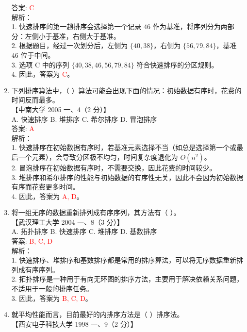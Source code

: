 \documentclass[lang=cn,newtx,10pt,scheme=chinese]{../../../elegantbook}
\begin{document}
\begin{enumerate}
    答案: \textcolor{red}{C} \\

    解析：\\
    1. 快速排序的第一趟排序会选择第一个记录 $46$ 作为基准，将序列分为两部分：左侧小于基准，右侧大于基准。\\
    2. 根据题目，经过一次划分后，左侧为 $\{40, 38\}$，右侧为 $\{56, 79, 84\}$，基准 $46$ 位于中间。\\
    3. 选项 C 中的序列 $\{40, 38, 46, 56, 79, 84\}$ 符合快速排序的分区规则。\\
    4. 因此，答案为 \textcolor{red}{C}。\\
    \item 下列排序算法中，（ ）算法可能会出现下面的情况：初始数据有序时，花费的时间反而最多。\\
    【中南大学 2005 一、4（2 分）】\\  

    A. 快速排序 \quad B. 堆排序 \quad C. 希尔排序 \quad D. 冒泡排序 \\

    答案: \textcolor{red}{A} \\

    解析：\\
    1. 快速排序在初始数据有序时，若基准元素选择不当（如总是选择第一个或最后一个元素），会导致分区极不均匀，时间复杂度退化为 $O(n^2)$。\\
    2. 冒泡排序在初始数据有序时，不需要交换，因此花费的时间较少。\\
    3. 堆排序和希尔排序的性能与初始数据的有序性无关，因此不会因为初始数据有序而花费更多时间。\\
    4. 因此，答案为 \textcolor{red}{A, D}。\\

    \item 将一组无序的数据重新排列成有序序列，其方法有（ ）。\\
    【武汉理工大学 2004 一、8（3 分）】\\  

    A. 拓扑排序 \quad B. 快速排序 \quad C. 堆排序 \quad D. 基数排序 \\

    答案: \textcolor{red}{B, C, D} \\

    解析：\\
    1. 快速排序、堆排序和基数排序都是常用的排序算法，可以将无序数据重新排列成有序序列。\\
    2. 拓扑排序是一种用于有向无环图的排序方法，主要用于解决依赖关系问题，不适用于一般的排序任务。\\
    3. 因此，答案为 \textcolor{red}{B, C, D}。\\
    \item 就平均性能而言，目前最好的内排序方法是（ ）排序法。\\
    【西安电子科技大学 1998 一、9（2 分）】\\  


\end{enumerate}
\end{document}
